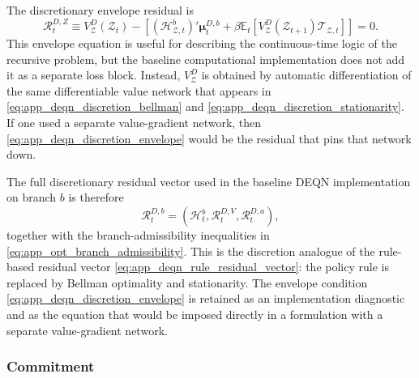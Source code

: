﻿\documentclass[12pt]{article}
\theoremstyle{remark}
\newcommand{\E}{\mathbb E}
\begin{document}
The discretionary envelope residual is
\begin{equation}
    \mathcal R_t^{D,Z}
    \equiv
    V_{\mathcal Z}^D(\mathcal Z_t)
    -
    \left[
        \left(\mathcal H_{\mathcal Z,t}^{b}\right)'
        \boldsymbol\mu_t^{D,b}
        +
        \beta
        \E_t
        \left[
            V_{\mathcal Z}^D(\mathcal Z_{t+1})
            \mathcal T_{\mathcal Z,t}
        \right]
    \right]
    =
    0.
    \label{eq:app_deqn_discretion_envelope}
\end{equation}
This envelope equation is useful for describing the continuous-time logic of the recursive problem,
but the baseline computational implementation does not add it as a separate loss block. Instead,
$V_{\mathcal Z}^D$ is obtained by automatic differentiation of the same differentiable value
network that appears in \eqref{eq:app_deqn_discretion_bellman} and
\eqref{eq:app_deqn_discretion_stationarity}. If one used a separate value-gradient network, then
\eqref{eq:app_deqn_discretion_envelope} would be the residual that pins that network down.

The full discretionary residual vector used in the baseline DEQN implementation on branch $b$ is
therefore
\begin{equation}
    \mathcal R_t^{D,b}
    =
    \left(
        \mathcal H_t^b,
        \mathcal R_t^{D,V},
        \mathcal R_t^{D,a}
    \right),
    \label{eq:app_deqn_discretion_full_residual}
\end{equation}
together with the branch-admissibility inequalities in \eqref{eq:app_opt_branch_admissibility}.
This is the discretion analogue of the rule-based residual vector
\eqref{eq:app_deqn_rule_residual_vector}: the policy rule is replaced by Bellman optimality and
stationarity. The envelope condition \eqref{eq:app_deqn_discretion_envelope} is retained as an
implementation diagnostic and as the equation that would be imposed directly in a formulation with a
separate value-gradient network.

\subsubsection*{Commitment}
\end{document}
